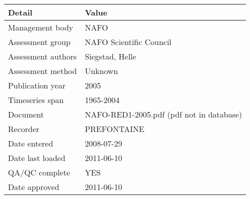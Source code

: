 \begin{table}[htb]
\centering
\begin{tabular}{ll}
\toprule
Detail & Value \\
\midrule
Management body    & NAFO                                     \\
Assessment group   & NAFO Scientific Council                  \\
Assessment authors & Siegstad, Helle                          \\
Assessment method  & Unknown                                  \\
Publication year   & 2005                                     \\
Timeseries span    & 1965-2004                                \\
Document           & NAFO-RED1-2005.pdf (pdf not in database) \\
Recorder           & PREFONTAINE                              \\
Date entered       & 2008-07-29                               \\
Date last loaded   & 2011-06-10                               \\
QA/QC complete     & YES                                      \\
Date approved      & 2011-06-10                               \\
\bottomrule
\end{tabular}
\label{tab:assessdet}
\end{table}
